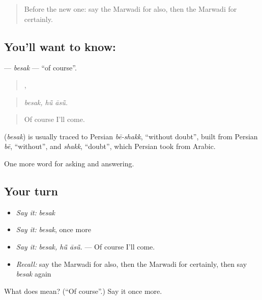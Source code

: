 \begin{quote}
Before the new one: say the Marwadi for also, then the Marwadi for certainly.
\end{quote}

\subsection*{You'll want to know: }
\textbf{} — \emph{besak} — \textquotedblleft{}of course\textquotedblright{}.

\begin{quote}
,  
\end{quote}

\begin{quote}
\emph{besak, hū̃ āsū̃.}
\end{quote}

\begin{quote}
Of course I'll come.
\end{quote}

\begin{cousinweb}
\textbf{} (\emph{besak}) is usually traced to Persian \emph{bē-shakk}, \textquotedblleft{}without doubt\textquotedblright{}, built from Persian \emph{bē}, \textquotedblleft{}without\textquotedblright{}, and \emph{shakk}, \textquotedblleft{}doubt\textquotedblright{}, which Persian took from Arabic.
\end{cousinweb}

\begin{grammarlens}[title={What you've built}]
One more word for asking and answering.
\end{grammarlens}

\subsection*{Your turn}
\begin{itemize}
\raggedright
  \item \emph{Say it:} \emph{besak}
  \item \emph{Say it:} \emph{besak}, once more
  \item \emph{Say it:} \emph{besak, hū̃ āsū̃.} — Of course I'll come.
  \item \emph{Recall:} say the Marwadi for also, then the Marwadi for certainly, then say \emph{besak} again
\end{itemize}

\begin{tcolorbox}[breakable,colback=teal!4,colframe=teal!35!black,title={Before you move on}]
What does  mean? (\textquotedblleft{}Of course\textquotedblright{}.) Say it once more.
\end{tcolorbox}

